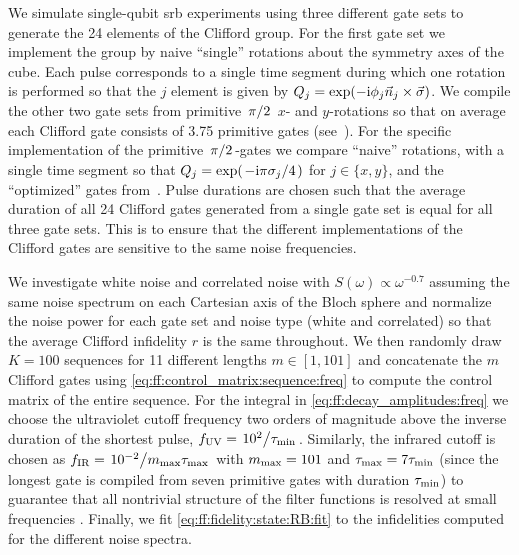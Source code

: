 We simulate single-qubit \gls{srb} experiments using three different gate sets to generate the 24 elements of the Clifford group.
For the first gate set we implement the group by naive \enquote{single} rotations about the symmetry axes of the cube.
Each pulse corresponds to a single time segment during which one rotation is performed so that the $j$ element is given by $Q_j = \exp(-\mathrm{i}\phi_j\vec{n}_j\times\vec{\sigma})$.
We compile the other two gate sets from primitive $\flatfrac{\pi}{2}$ $x$- and $y$-rotations so that on average each Clifford gate consists of \num{3.75} primitive gates (see~).
For the specific implementation of the primitive $\flatfrac{\pi}{2}$-gates we compare \enquote{naive} rotations, \ie with a single time segment so that $Q_j = \exp(\flatfrac{-\i\pi\sigma_j}{4})$ for $j\in\lbrace x, y\rbrace$, and the \enquote{optimized} gates from~.
Pulse durations are chosen such that the average duration of all 24 Clifford gates generated from a single gate set is equal for all three gate sets.
This is to ensure that the different implementations of the Clifford gates are sensitive to the same noise frequencies.

We investigate white noise and correlated noise with $S(\omega)\propto\omega^{-0.7}$ assuming the same noise spectrum on each Cartesian axis of the Bloch sphere and normalize the noise power for each gate set and noise type (white and correlated) so that the average Clifford infidelity $r$ is the same throughout.
We then randomly draw $K = \num{100}$ sequences for \num{11} different lengths $m\in[1, 101]$ and concatenate the $m$ Clifford gates using \cref{eq:ff:control_matrix:sequence:freq} to compute the control matrix of the entire sequence.
For the integral in \cref{eq:ff:decay_amplitudes:freq} we choose the ultraviolet cutoff frequency two orders of magnitude above the inverse duration of the shortest pulse, $f_\mr{UV} = \flatfrac{10^2}{\tau_\mr{min}}$.
Similarly, the infrared cutoff is chosen as $f_\mr{IR} = \flatfrac{10^{-2}}{m_\mr{max}\tau_\mr{max}}$ with $m_{\mathrm{max}} = 101$ and $\tau_{\mathrm{max}} = 7\tau_{\mathrm{min}}$ (since the longest gate is compiled from seven primitive gates with duration $\tau_{\mathrm{min}}$) to guarantee that all nontrivial structure of the filter functions is resolved at small frequencies
.
Finally, we fit \cref{eq:ff:fidelity:state:RB:fit} to the infidelities computed for the different noise spectra.

